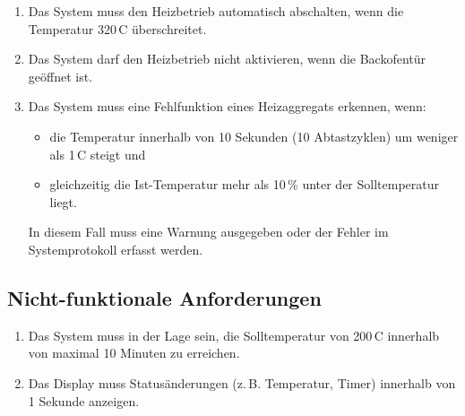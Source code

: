 \documentclass[a4paper,12pt]{article}
\begin{document}
\begin{enumerate}[label=\textbf{2.2.\arabic*}, itemsep=0pt, topsep=0pt, font=\bfseries]
    \item Das System muss den Heizbetrieb automatisch abschalten, wenn die Temperatur 320\,\textdegree{}C überschreitet.
    \item Das System darf den Heizbetrieb nicht aktivieren, wenn die Backofentür geöffnet ist.
    \item Das System muss eine Fehlfunktion eines Heizaggregats erkennen, wenn:
    \begin{itemize}
        \item die Temperatur innerhalb von 10 Sekunden (10 Abtastzyklen) um weniger als 1\,\textdegree{}C steigt und
        \item gleichzeitig die Ist-Temperatur mehr als 10\,\% unter der Solltemperatur liegt.
    \end{itemize}
    In diesem Fall muss eine Warnung ausgegeben oder der Fehler im Systemprotokoll erfasst werden.
\end{enumerate}

\subsection{Nicht-funktionale Anforderungen}

\begin{enumerate}[label=\textbf{2.3.\arabic*}, itemsep=0pt, topsep=0pt, font=\bfseries]
    \item Das System muss in der Lage sein, die Solltemperatur von 200\,\textdegree{}C innerhalb von maximal 10 Minuten zu erreichen.
    \item Das Display muss Statusänderungen (z.\,B. Temperatur, Timer) innerhalb von 1 Sekunde anzeigen.
\end{enumerate}
\end{document}
